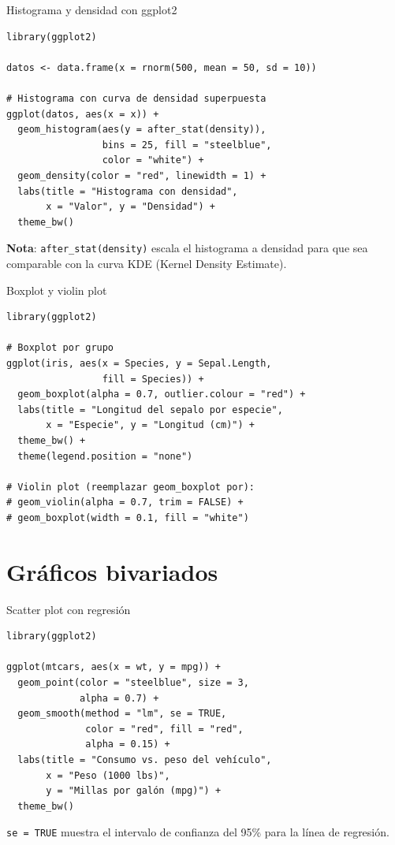 \documentclass[aspectratio=169]{beamer}
\begin{document}
\begin{frame}[fragile]{Histograma y densidad con ggplot2}
\begin{lstlisting}[style=rcode]
library(ggplot2)

datos <- data.frame(x = rnorm(500, mean = 50, sd = 10))

# Histograma con curva de densidad superpuesta
ggplot(datos, aes(x = x)) +
  geom_histogram(aes(y = after_stat(density)),
                 bins = 25, fill = "steelblue",
                 color = "white") +
  geom_density(color = "red", linewidth = 1) +
  labs(title = "Histograma con densidad",
       x = "Valor", y = "Densidad") +
  theme_bw()
\end{lstlisting}

\medskip
\textbf{Nota}: \texttt{after\_stat(density)} escala el histograma a densidad para que sea comparable con la curva KDE (Kernel Density Estimate).
\end{frame}

\begin{frame}[fragile]{Boxplot y violin plot}
\begin{lstlisting}[style=rcode]
library(ggplot2)

# Boxplot por grupo
ggplot(iris, aes(x = Species, y = Sepal.Length,
                 fill = Species)) +
  geom_boxplot(alpha = 0.7, outlier.colour = "red") +
  labs(title = "Longitud del sepalo por especie",
       x = "Especie", y = "Longitud (cm)") +
  theme_bw() +
  theme(legend.position = "none")

# Violin plot (reemplazar geom_boxplot por):
# geom_violin(alpha = 0.7, trim = FALSE) +
# geom_boxplot(width = 0.1, fill = "white")
\end{lstlisting}
\end{frame}

\section{Gráficos bivariados}

\begin{frame}[fragile]{Scatter plot con regresión}
\begin{lstlisting}[style=rcode]
library(ggplot2)

ggplot(mtcars, aes(x = wt, y = mpg)) +
  geom_point(color = "steelblue", size = 3,
             alpha = 0.7) +
  geom_smooth(method = "lm", se = TRUE,
              color = "red", fill = "red",
              alpha = 0.15) +
  labs(title = "Consumo vs. peso del vehículo",
       x = "Peso (1000 lbs)",
       y = "Millas por galón (mpg)") +
  theme_bw()
\end{lstlisting}

\medskip
\texttt{se = TRUE} muestra el intervalo de confianza del 95\% para la línea de regresión.
\end{frame}
\end{document}
